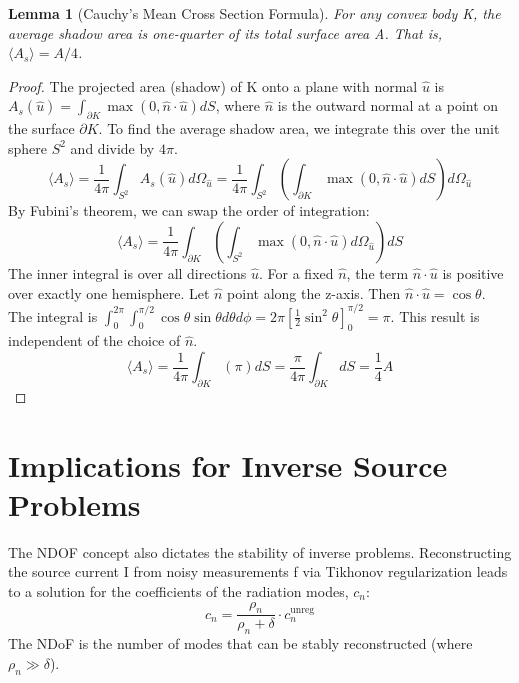 \documentclass[11pt,a4paper]{article}
\newcommand{\avg}[1]{\langle #1 \rangle} %
\newtheorem{lemma}[theorem]{Lemma}
\begin{document}
\begin{lemma}[Cauchy's Mean Cross Section Formula]
For any convex body K, the average shadow area is one-quarter of its total surface area A. That is, \(\avg{A_{s}}=A/4\).
\end{lemma}

\begin{proof}
The projected area (shadow) of K onto a plane with normal \(\hat{u}\) is \(A_{s}(\hat{u})=\int_{\partial K}\max(0,\hat{n}\cdot\hat{u})dS\), where \(\hat{n}\) is the outward normal at a point on the surface \(\partial K\). To find the average shadow area, we integrate this over the unit sphere \(S^{2}\) and divide by \(4\pi\).
\begin{equation}
    \avg{A_{s}}=\frac{1}{4\pi}\int_{S^{2}}A_{s}(\hat{u})d\Omega_{\hat{u}}=\frac{1}{4\pi}\int_{S^{2}}\left(\int_{\partial K}\max(0,\hat{n}\cdot\hat{u})dS\right)d\Omega_{\hat{u}}
\end{equation}
By Fubini's theorem, we can swap the order of integration:
\begin{equation}
    \avg{A_{s}}=\frac{1}{4\pi}\int_{\partial K}\left(\int_{S^{2}}\max(0,\hat{n}\cdot\hat{u})d\Omega_{\hat{u}}\right)dS
\end{equation}
The inner integral is over all directions \(\hat{u}\). For a fixed \(\hat{n}\), the term \(\hat{n}\cdot\hat{u}\) is positive over exactly one hemisphere. Let \(\hat{n}\) point along the z-axis. Then \(\hat{n}\cdot\hat{u}=\cos\theta\). The integral is \(\int_{0}^{2\pi}\int_{0}^{\pi/2}\cos\theta \sin\theta d\theta d\phi=2\pi\left[\frac{1}{2}\sin^{2}\theta\right]_{0}^{\pi/2}=\pi\). This result is independent of the choice of \(\hat{n}\).
\begin{equation}
    \avg{A_{s}}=\frac{1}{4\pi}\int_{\partial K}(\pi)dS=\frac{\pi}{4\pi}\int_{\partial K}dS=\frac{1}{4}A
\end{equation}
\end{proof}

\section{Implications for Inverse Source Problems}

The NDOF concept also dictates the stability of inverse problems. Reconstructing the source current I from noisy measurements f via Tikhonov regularization leads to a solution for the coefficients of the radiation modes, \(c_{n}\):
\begin{equation}
    c_{n}=\frac{\rho_{n}}{\rho_{n}+\delta}\cdot c_{n}^{\text{unreg}}
\end{equation}
The NDoF is the number of modes that can be stably reconstructed (where \(\rho_{n}\gg\delta\)).
\end{document}

